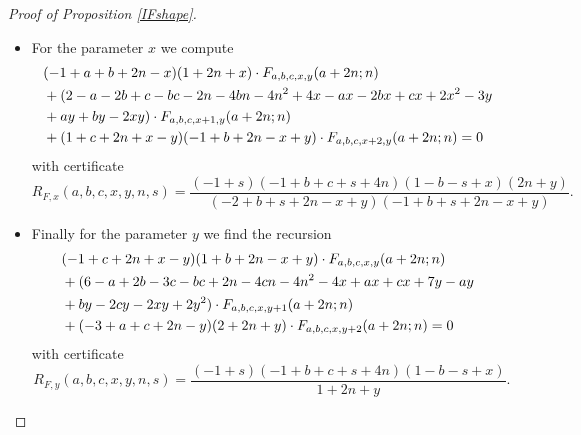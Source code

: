 \documentclass{amsart}
\numberwithin{equation}{section}
\begin{document}
\begin{proof}[Proof of Proposition \ref{IFshape}]
\begin{itemize}
        \begin{align}
            &(1 + b + c + 4 n) (2 + b + c + 4 n) (-1 + a + c + 2 n - y)\cdot F_{a,b,c,x,y}(a+2n;n)\\
            &-(2 + b + c + 4 n)  (a + c + 2 a c + b c + 2 c^2 + 2 n + 4 a n + 
              12 c n + 12 n^2 + a x + c x  \hphantom{a}\notag\\
            &+4 n x - y - a y - b y - 2 c y -  8  n  y)\cdot F_{a,b,c+1,x,y}(a+2n;n)\hphantom{a}\notag\\
            &+(1 + c + 2 n) (1 + a + b + c + 6 n) (1 + c + 2 n + x - y)\cdot F_{a,b,c+2,x,y}(a+2n;n)=0\notag
        \end{align}
        with certificate
        \[R_{F,c}(a,b,c,x,y,n,s)=\frac{(-1 + s) (1 + b + c + 4 n) (2 + b + c + 4 n) (1 - b - s + x)}{b + c + s + 4 n}.\]
        \item For the parameter $x$ we compute
        \begin{align}
            &(-1 + a + b + 2 n - x) (1 + 2 n + x)\cdot F_{a,b,c,x,y}(a+2n;n)\hphantom{a}\\
            &+(2 - a - 2 b + c - b c - 2 n - 4 b n - 4 n^2 + 4 x - a x - 2 b x +  c x + 2 x^2 - 3 y  \hphantom{a}\notag\\
            &+a y + b y - 2 x y)\cdot F_{a,b,c,x+1,y}(a+2n;n)\hphantom{a}\notag\\
            &+(1 + c + 2 n + x - y) (-1 + b + 2 n - x + y)\cdot F_{a,b,c,x+2,y}(a+2n;n)=0\notag
        \end{align}
        with certificate
        \[R_{F,x}(a,b,c,x,y,n,s)=\frac{(-1 + s) (-1 + b + c + s + 4 n) (1 - b - s + x) (2 n + y)}{(-2 + b +s + 2 n - x + y) (-1 + b + s + 2 n - x + y)}.\]
        \item Finally for the parameter $y$ we find the recursion
        \begin{align}
            &(-1 + c + 2 n + x - y) (1 + b + 2 n - x + y)\cdot F_{a,b,c,x,y}(a+2n;n)\hphantom{a}\\
            &+(6 - a + 2 b - 3 c - b c + 2 n - 4 c n - 4 n^2 - 4 x + a x + c x + 7 y - a y  \hphantom{a}\notag\\  
            &+b y - 2 c y - 2 x y + 2 y^2)\cdot F_{a,b,c,x,y+1}(a+2n;n)\hphantom{a}\notag\\
            &+(-3 + a + c + 2 n - y) (2 + 2 n + y)\cdot F_{a,b,c,x,y+2}(a+2n;n)=0\notag
        \end{align}
        with certificate
        \[R_{F,y}(a,b,c,x,y,n,s)=\frac{(-1 + s) (-1 + b + c + s + 4 n) (1 - b - s + x)}{1 + 2 n + y}.\]

\end{itemize}
\end{proof}
\end{document}
